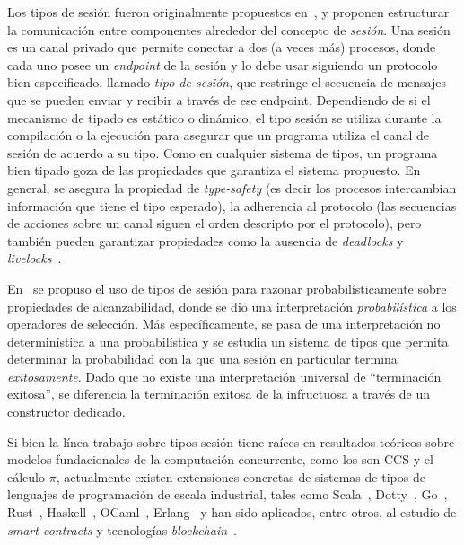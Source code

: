 Los tipos de sesión fueron originalmente propuestos en~\cite {Honda93}, y
proponen estructurar la comunicación entre componentes alrededor
del concepto de {\em sesión}. Una {sesión} es un canal privado que permite
conectar a dos (a veces más) procesos, donde cada uno posee un
\emph{endpoint} de la sesión y lo debe usar siguiendo un protocolo bien
especificado, llamado \emph{tipo de sesión}, que restringe el secuencia de
mensajes que se pueden enviar y recibir a través de ese endpoint. Dependiendo
de si el mecanismo de tipado es estático o dinámico, el tipo sesión se utiliza
durante la compilación o la ejecución para asegurar que un programa utiliza el
canal de sesión de acuerdo a su tipo. Como en cualquier sistema de tipos, un
programa bien tipado goza de las propiedades que garantiza el sistema
propuesto. En general, se asegura la propiedad de  {\em type-safety} (es decir
los procesos intercambian información que tiene el tipo esperado), la
adherencia al protocolo (las secuencias de acciones sobre un canal siguen el
orden descripto por el protocolo), pero también pueden garantizar propiedades
como la ausencia de {\em deadlocks} y {\em livelocks}~\cite{HuttelEtAl16}.

En~\cite{DBLP:conf/concur/InversoMPTT20} se propuso el uso de tipos de sesión
para razonar probabilísticamente sobre propiedades de alcanzabilidad, donde
se dio una interpretación \emph{probabilística} a los operadores de
selección. Más específicamente, se pasa de una interpretación no
determinística a una probabilística y se estudia un sistema de tipos que
permita determinar la probabilidad con la que una sesión en particular
termina \emph{exitosamente}. Dado que no existe una interpretación universal
de ``terminación exitosa'', se diferencia la terminación exitosa de la
infructuosa a través de un {constructor dedicado}.

Si bien la línea trabajo sobre tipos sesión tiene raíces en resultados
teóricos sobre modelos fundacionales de la computación concurrente, como
los son CCS y el cálculo $\pi$, actualmente existen extensiones
concretas de sistemas de tipos de lenguajes de programación de escala
industrial, tales como Scala~\cite{DBLP:conf/pldi/ScalasYB19},
Dotty~\cite{DBLP:conf/pldi/ScalasYB19},
Go~\cite{DBLP:conf/icse/LangeNTY18,DBLP:conf/icse/LangeNTY18},
Rust~\cite{DBLP:journals/corr/abs-1909-05970,DBLP:conf/coordination/LagaillardieNY20},
Haskell~\cite{orchard2017session,DBLP:conf/haskell/LindleyM16},
OCaml~\cite{DBLP:journals/jfp/Padovani17,DBLP:conf/coordination/LagaillardieNY20,DBLP:conf/ecoop/ImaiNYY19},
Erlang~\cite{fowler2016erlang} y han sido aplicados, entre otros, al estudio de
{\em smart contracts} y tecnologías {\em
blockchain}~\cite{10.1145/3417516,DBLP:journals/corr/abs-1902-06056}. 

